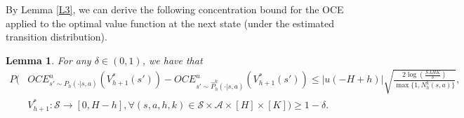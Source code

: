 \documentclass[11pt]{article}
\newtheorem{lemma}{Lemma}
\newcommand{\1}{\mathbbm{1}}
\newcommand{\gao}[1]{\textcolor{blue}{{#1}}} %
\begin{document}
By Lemma \ref{L3}, we can derive the following concentration bound for the OCE applied to the optimal value function at the next state (under the estimated transition distribution).  




\begin{lemma}\label{L4}
For any $\delta\in (0,1)$, we have that 
\begin{equation}
\begin{aligned}
P\Bigg( & OCE^{u}_{s'\sim P_h(\cdot\vert s,a)}(V_{h+1}^*(s'))-OCE^{u}_{s'\sim \hat{P}^k_h(\cdot\vert s,a)}(V_{h+1}^*(s')) \leq \vert u(-H+h)\vert\sqrt{\frac{2\log\left (\frac{SAHK}{\delta}\right )}{\max\{1,N_h^k(s,a)\}}},\\
&V_{h+1}^*:\mathcal{S}\to [0,H-h],\forall (s,a,h,k)\in \mathcal{S}\times \mathcal{A}\times [H]\times [K]\Bigg)\geq 1-\delta.
\end{aligned}
\end{equation}
\end{lemma}
\end{document}
